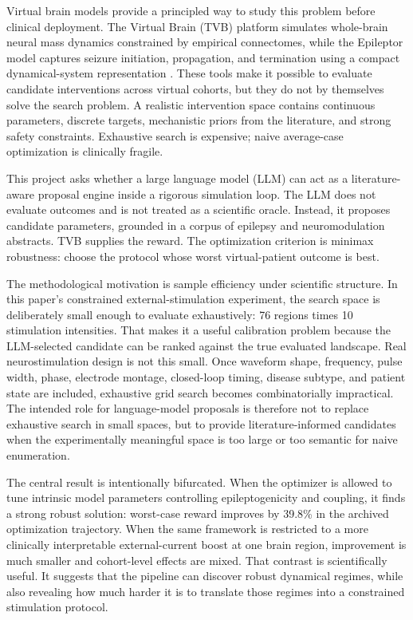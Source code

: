 \documentclass{article}
\begin{document}
Virtual brain models provide a principled way to study this problem before clinical deployment. The Virtual Brain (TVB) platform simulates whole-brain neural mass dynamics constrained by empirical connectomes, while the Epileptor model captures seizure initiation, propagation, and termination using a compact dynamical-system representation \cite{sanzleon2013tvb,jirsa2014seizure,proix2017vep}. These tools make it possible to evaluate candidate interventions across virtual cohorts, but they do not by themselves solve the search problem. A realistic intervention space contains continuous parameters, discrete targets, mechanistic priors from the literature, and strong safety constraints. Exhaustive search is expensive; naive average-case optimization is clinically fragile.

This project asks whether a large language model (LLM) can act as a literature-aware proposal engine inside a rigorous simulation loop. The LLM does not evaluate outcomes and is not treated as a scientific oracle. Instead, it proposes candidate parameters, grounded in a corpus of epilepsy and neuromodulation abstracts. TVB supplies the reward. The optimization criterion is minimax robustness: choose the protocol whose worst virtual-patient outcome is best.

The methodological motivation is sample efficiency under scientific structure. In this paper's constrained external-stimulation experiment, the search space is deliberately small enough to evaluate exhaustively: 76 regions times 10 stimulation intensities. That makes it a useful calibration problem because the LLM-selected candidate can be ranked against the true evaluated landscape. Real neurostimulation design is not this small. Once waveform shape, frequency, pulse width, phase, electrode montage, closed-loop timing, disease subtype, and patient state are included, exhaustive grid search becomes combinatorially impractical. The intended role for language-model proposals is therefore not to replace exhaustive search in small spaces, but to provide literature-informed candidates when the experimentally meaningful space is too large or too semantic for naive enumeration.

The central result is intentionally bifurcated. When the optimizer is allowed to tune intrinsic model parameters controlling epileptogenicity and coupling, it finds a strong robust solution: worst-case reward improves by 39.8\% in the archived optimization trajectory. When the same framework is restricted to a more clinically interpretable external-current boost at one brain region, improvement is much smaller and cohort-level effects are mixed. That contrast is scientifically useful. It suggests that the pipeline can discover robust dynamical regimes, while also revealing how much harder it is to translate those regimes into a constrained stimulation protocol.
\end{document}

